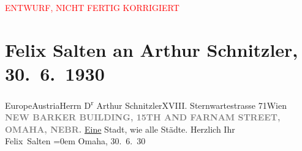 
\begin{center}
            \textcolor{red}{ENTWURF, NICHT FERTIG KORRIGIERT}
                      \end{center}
            
         \renewcommand{\erwaehnteOrte}{Orte: 15th Street (Omaha), Barker Building, Europa, Farnam Street, Omaha, Sternwartestraße, Wien, Österreich}
         \renewcommand{\erwaehnteWerke}{}
               \section[Felix Salten an Arthur Schnitzler, 30. 6. 1930]{ Felix Salten an Arthur Schnitzler, 30. 6. 1930}\nopagebreak{}\rehead{ }\begin{ledgroupsized}[t]{13cm}\normalsize\beginnumbering \toendnotes[C]{\smallbreak\pagebreak[2]} 
\pstart{}{\pb}Europe\pend{}\pstart{}Austria\pend{}\pstart{}Herrn D\textsuperscript{r} Arthur Schnitzler\pend{}\pstart{}XVIII. Sternwartestrasse 71\pend{}\pstart{}Wien\pend{}{\bigskip}\pstart
           \noindent{}\centering{}{\pb}\textcolor{gray}{\textbf{NEW BARKER BUILDING, 15TH AND FARNAM
                           STREET, OMAHA, NEBR.}}\pend
           \pstart
           {\pb}\uline{Eine} Stadt, wie alle Städte.\pend
           \pstart
           Herzlich Ihr {\\[\baselineskip]}\spacefill\mbox{Felix Salten}\pend
           \leftskip=0em{}\pstart
           Omaha, 30. 6. 30\pend
           
         
         \endnumbering{}\end{ledgroupsized}\begin{anhang}\end{anhang}\newcommand{\dateiname}{L02799}\newcommand{\titel}{Felix Salten an Arthur Schnitzler, 30. 6. 1930}\newcommand{\editorInnen}{Martin Anton Müller und Laura Untner}
      